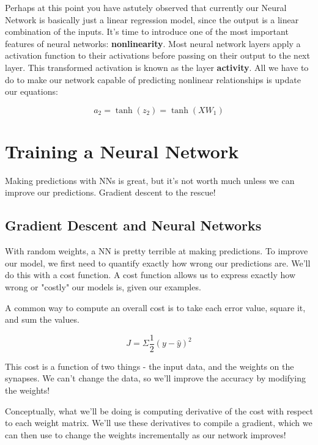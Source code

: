 \documentclass[]{article}
\begin{document}
Perhaps at this point you have astutely observed that currently our Neural Network is basically just a linear regression model, since the output is a linear combination of the inputs. It's time to introduce one of the most important features of neural networks: \textbf{nonlinearity}. Most neural network layers apply a activation function to their activations before passing on their output to the next layer. This transformed activation is known as the layer \textbf{activity}. All we have to do to make our network capable of predicting nonlinear relationships is update our equations:

\begin{equation}
	a_2 = \tanh (z_2) = \tanh (XW_1)
\end{equation}

\section{Training a Neural Network}

Making predictions with NNs is great, but it's not worth much unless we can improve our predictions. Gradient descent to the rescue!

\subsection{Gradient Descent and Neural Networks}
With random weights, a NN is pretty terrible at making predictions. To improve our model, we first need to quantify exactly how wrong our predictions are. We'll do this with a cost function. A cost function allows us to express exactly how wrong or "costly" our models is, given our examples.

A common way to compute an overall cost is to take each error value, square it, and sum the values. 

\begin{equation}
	J = \Sigma \frac{1}{2}(y- \hat{y})^{2}
\end{equation}

This cost is a function of two things - the input data, and the weights on the synapses. We can't change the data, so we'll improve the accuracy by modifying the weights!

Conceptually, what we'll be doing is computing derivative of the cost with respect to each weight matrix. We'll use these derivatives to compile a gradient, which we can then use to change the weights incrementally as our network improves!
\end{document}
